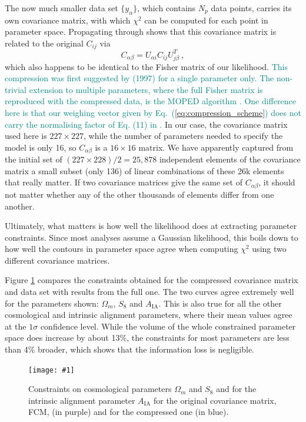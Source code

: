\documentclass[twocolumn]{\docclass}
\newcommand{\sfig}[2]{
	\texttt{[image: \#1]}
}
\newcommand{\Sfig}[2]{
	\begin{figure}[thbp]
		\sfig{../figures/#1.pdf}{\columnwidth}
		\caption{{\small #2}}
		\label{fig:#1}
	\end{figure}
}
\newcommand{\rf}[1]{Figure \ref{fig:#1}}
\newcommand{\ec}[1]{Eq.~(\ref{eq:#1})}
\newcommand\be{\begin{equation}}
\newcommand\ee{\end{equation}}
\newcommand\full{FCM}
\begin{document}
	The now much smaller data set $\{y_\alpha\}$, which contains $N_p$ data points, carries its own covariance matrix, with which $\chi^2$ can be computed for each point in parameter space. Propagating through shows that this covariance matrix is related to the original $C_{ij}$ via
	\be
	C_{\alpha\beta} = U_{\alpha i} C_{ij} U^T_{j\beta}\ 
	,\ee
	which also happens to be identical to the Fisher matrix of our likelihood. \textcolor{teal}{This compression was first suggested by \citeauthor{Tegmark:1997maa} (1997) for a single parameter only.  The non-trivial extension to multiple parameters, where the full Fisher matrix is reproduced with the compressed data, is the MOPED algorithm \citep{Heavens:2000hjl}. One difference here is that our weighing vector given by \ec{compression_scheme} does not carry the normalising factor of Eq. (11) in \citep{Heavens:2000hjl}.} In our case, the covariance matrix used here is  $227 \times 227$, while the number of parameters needed to specify the model is only 16, so $C_{\alpha\beta}$ is a $16\times 16$ matrix. We have apparently captured from the initial set of $(227 \times 228)/2 = 25,878$ independent elements of the covariance matrix a small subset (only 136) of linear combinations of these 26k elements that really matter. If two covariance matrices give the same set of $C_{\alpha\beta}$, it should not matter whether any of the other thousands of elements differ from one another.
	
	Ultimately, what matters is how well the likelihood does at extracting parameter constraints. Since most analyses assume a Gaussian likelihood, this boils down to how well the contours in parameter space agree when computing $\chi^2$ using two different covariance matrices.	
	
	\rf{Comp2pt-constraints_wmS8A} compares the constraints obtained for the compressed covariance matrix and data set with results from the full one. The two curves agree extremely well for the parameters shown: $\Omega_m$, $S_8$ and $A_{\mathrm{IA}}$. This is also true for all the other cosmological and intrinsic alignment parameters, where their mean values agree at the $1 \sigma$ confidence level. While the volume of the whole constrained parameter space does increase by about 13\%, the constraints for most parameters are less than 4\% broader, which shows that the information loss is negligible. 
	
	\Sfig{Comp2pt-constraints_wmS8A}{Constraints on cosmological parameters $\Omega_m$ and $S_8$ and for the intrinsic alignment parameter $A_{\mathrm{IA}}$ for the original covariance matrix, \full, (in purple) and for the compressed one (in blue).}
	
\end{document}
